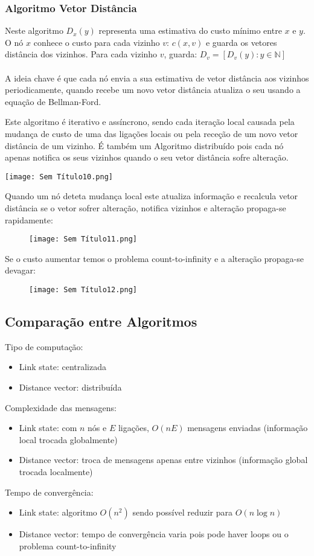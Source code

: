 \documentclass[10pt,a4paper]{report}
\begin{document}
\subsubsection{Algoritmo Vetor Distância}
Neste algoritmo $D_x(y)$ representa uma estimativa do custo mínimo entre $x$ e $y$. O nó $x$ conhece o custo para cada vizinho $v$: $c(x,v)$ e guarda os vetores distância dos vizinhos. Para cada vizinho $v$, guarda: $D_v = [D_v(y): y \in \mathbb{N} ]$\\
\\
A ideia chave é que cada nó envia a sua estimativa de vetor distância aos vizinhos periodicamente, quando recebe um novo vetor distância atualiza o seu usando a equação de Bellman-Ford.\\
\begin{minipage}[c]{0.7\linewidth}
Este algoritmo é iterativo e assíncrono, sendo cada iteração local causada pela mudança de custo de uma das ligações locais ou pela receção de um novo vetor
distância de um vizinho. É também um Algoritmo distribuído pois cada nó apenas notifica os seus vizinhos quando o seu vetor distância sofre alteração.
\end{minipage}
\begin{minipage}[c]{0.35\linewidth}
\texttt{[image: Sem Título10.png]}
\end{minipage}
Quando um nó deteta mudança local este atualiza informação e recalcula vetor distância se o vetor sofrer alteração, notifica vizinhos e alteração propaga-se rapidamente:
\begin{figure}[H]
\centering
\texttt{[image: Sem Título11.png]}
\end{figure}
Se o custo aumentar temos o problema count-to-infinity e a alteração propaga-se devagar:
\begin{figure}[H]
\centering
\texttt{[image: Sem Título12.png]}
\end{figure}
\subsection{Comparação entre Algoritmos}
Tipo de computação:
\begin{itemize}
\item Link state: centralizada
\item Distance vector: distribuída
\end{itemize}
Complexidade das mensagens:
\begin{itemize}
\item Link state: com $n$ nós e $E$ ligações, $O(nE)$ mensagens enviadas (informação local trocada globalmente)
\item Distance vector: troca de mensagens apenas entre vizinhos (informação global trocada localmente)
\end{itemize}
Tempo de convergência:
\begin{itemize}
\item Link state: algoritmo $O(n^2)$ sendo possível reduzir para $O(n \log n)$
\item Distance vector: tempo de convergência varia pois pode haver loops ou o problema count-to-infinity
\end{itemize}
\end{document}
